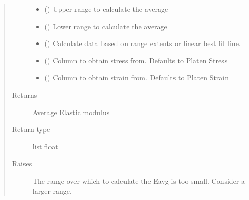 \documentclass[letterpaper,10pt,english]{sphinxmanual}
\begin{document}
\begin{fulllineitems}
\begin{fulllineitems}
\begin{quote}
\begin{description}
\begin{itemize}
\item {} 
 () \textendash{} Upper range to calculate the average

\item {} 
 () \textendash{} Lower range to calculate the average

\item {} 
 () \textendash{} Calculate data based on range extents or linear best fit line.

\item {} 
 () \textendash{} Column to obtain stress from. Defaults to Platen Stress

\item {} 
 () \textendash{} Column to obtain strain from. Defaults to Platen Strain

\end{itemize}

\item[{Returns}] \leavevmode
Average Elastic modulus

\item[{Return type}] \leavevmode
list{[}float{]}

\item[{Raises}] \leavevmode
{} \textendash{} The range over which to calculate the Eavg is too small. Consider a larger range.


\end{description}
\end{quote}
\end{fulllineitems}
\end{fulllineitems}
\end{document}
